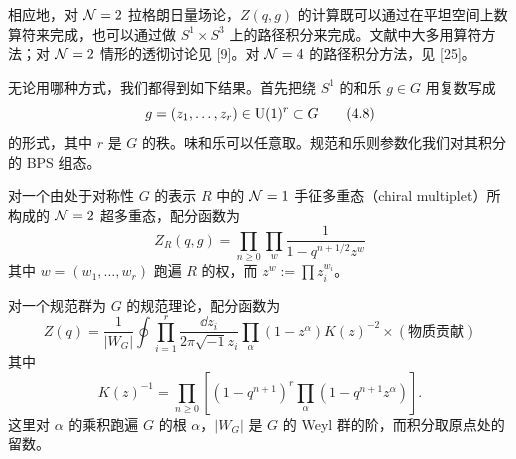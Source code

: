 
相应地，对 $\mathcal{N}=2$ 拉格朗日量场论，$Z(q,g)$ 的计算既可以通过在平坦空间上数算符来完成，也可以通过做 $S^1\times S^3$ 上的路径积分来完成。文献中大多用算符方法；对 $\mathcal{N}=2$ 情形的透彻讨论见 [9]。对 $\mathcal{N}=4$ 的路径积分方法，见 [25]。


无论用哪种方式，我们都得到如下结果。首先把绕 $S^1$ 的和乐 $g\in G$ 用复数写成
\begin{equation}
g=(z_1,\ldots,z_r)\in\mathrm{U}(1)^r\subset G
\tag{4.8}
\end{equation}
的形式，其中 $r$ 是 $G$ 的秩。味和乐可以任意取。规范和乐则参数化我们对其积分的 BPS 组态。


对一个由处于对称性 $G$ 的表示 $R$ 中的 $\mathcal{N}=1$ 手征多重态（chiral multiplet）所构成的 $\mathcal{N}=2$ 超多重态，配分函数为
\begin{equation}
Z_R(q,g)=\prod_{n\ge0}\prod_w\frac{1}{1-q^{n+1/2}z^w}
\tag{4.9}
\end{equation}
其中 $w=(w_1,\ldots,w_r)$ 跑遍 $R$ 的权，而 $z^w:=\prod z_i^{w_i}$。

对一个规范群为 $G$ 的规范理论，配分函数为
\begin{equation}
Z(q)=\frac{1}{|W_G|}\oint\prod_{i=1}^r\frac{\dd z_i}{2\pi\sqrt{-1}z_i}\prod_\alpha(1-z^\alpha)K(z)^{-2}\times(\text{物质贡献})
\tag{4.10}
\end{equation}
其中
\begin{equation}
K(z)^{-1}=\prod_{n\ge0}\left[(1-q^{n+1})^r\prod_\alpha(1-q^{n+1}z^\alpha)\right].
\tag{4.11}
\end{equation}
这里对 $\alpha$ 的乘积跑遍 $G$ 的根 $\alpha$，$|W_G|$ 是 $G$ 的 Weyl 群的阶，而积分取原点处的留数。

